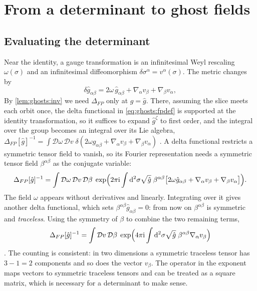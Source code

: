 \section{From a determinant to ghost fields}\label{sec:ghosts:ghosts}

\subsection{Evaluating the determinant}

Near the identity, a gauge transformation is an infinitesimal Weyl rescaling $\omega(\sigma)$
and an infinitesimal diffeomorphism $\delta\sigma^\alpha=v^\alpha(\sigma)$. The metric changes
by
\begin{equation}\label{eq:ghosts:deltag}
  \delta\hat g_{\alpha\beta}=2\omega\,\hat g_{\alpha\beta}+\nabla_\alpha v_\beta+\nabla_\beta v_\alpha ,
\end{equation}
By \cref{lem:ghosts:inv} we need $\Delta_{FP}$ only at $g=\hat g$. There, assuming the slice
meets each orbit once, the delta functional in \cref{eq:ghosts:fpdef} is supported at the
identity transformation, so it suffices to expand $\hat g^\zeta$ to first order, and the
integral over the group becomes an integral over its Lie algebra, $\Delta_{FP}[\hat g]^{-1}=\int\mathcal D\omega\,\mathcal Dv\;
\delta(2\omega\hat g_{\alpha\beta}+\nabla_\alpha v_\beta+\nabla_\beta v_\alpha)$
. A delta functional restricts a symmetric tensor field
to vanish, so its Fourier representation needs a symmetric tensor field $\beta^{\alpha\beta}$
as the conjugate variable:
\[
  \Delta_{FP}[\hat g]^{-1}=\int\mathcal D\omega\,\mathcal Dv\,\mathcal D\beta\;
  \exp\Bigl(2\pi\mathrm{i}\int\mathrm{d}^2\sigma\sqrt{\hat g}\;\beta^{\alpha\beta}
  \bigl[2\omega\hat g_{\alpha\beta}+\nabla_\alpha v_\beta+\nabla_\beta v_\alpha\bigr]\Bigr).
\]
The field $\omega$ appears without derivatives and linearly. Integrating over it gives
another delta functional, which sets $\beta^{\alpha\beta}\hat g_{\alpha\beta}=0$: from now on
$\beta^{\alpha\beta}$ is symmetric and \emph{traceless}. Using the symmetry of $\beta$ to
combine the two remaining terms,
\begin{equation}\label{eq:ghosts:fpinv}
  \Delta_{FP}[\hat g]^{-1}=\int\mathcal Dv\,\mathcal D\beta\;
  \exp\Bigl(4\pi\mathrm{i}\int\mathrm{d}^2\sigma\sqrt{\hat g}\;\beta^{\alpha\beta}\nabla_\alpha v_\beta\Bigr)
\end{equation}
. The counting is consistent: in two dimensions a
symmetric traceless tensor has $3-1=2$ components and so does the vector $v_\beta$. The
operator in the exponent maps vectors to symmetric traceless tensors and can be treated as a
square matrix, which is necessary for a determinant to make sense.

